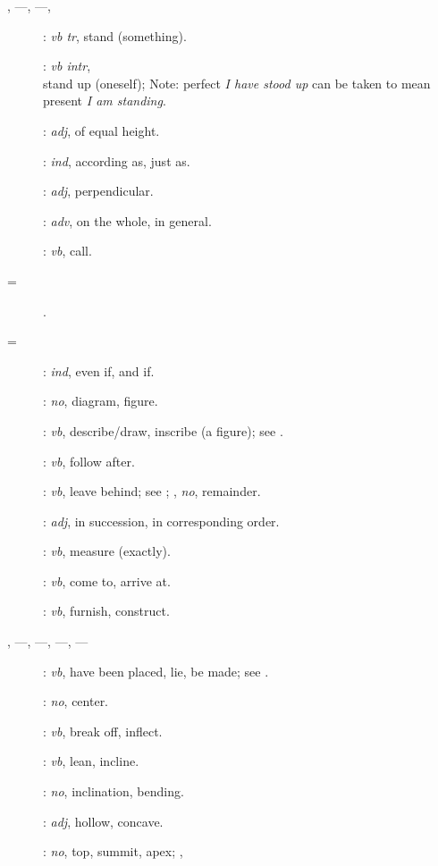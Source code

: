 {\begin{description}
\item[, ---, ---, ]: {\em vb tr}, 
stand (something).
\item[]: {\em vb intr}, \\
stand up (oneself); Note: perfect {\em I have stood up} can be taken to mean present {\em I am standing}.
\item[]: {\em adj}, of equal height.
\item[]: {\em ind}, according as, just as.
\item[]: {\em adj}, perpendicular.
\item[]: {\em adv}, on the whole, in general.
\item[]: {\em vb}, call.
\item[ = ].
\item[ = ]: {\em ind}, even if, and if.
\item[]: {\em no}, diagram, figure.
\item[]: {\em vb}, describe/draw, inscribe (a figure); see .
\item[]: {\em vb}, follow after.
\item[] : {\em vb}, leave behind; see ; , {\em no},
remainder. 
\item[]: {\em adj}, in succession, in corresponding order.
\item[]: {\em vb}, measure (exactly).
\item[]: {\em vb}, come to, arrive at.
\item[]: {\em vb}, furnish, construct.
\item[, ---, ---, ---, ---]: {\em vb}, have been placed,
lie, be made; see .
\item[]: {\em no}, center.
\item[]: {\em vb}, break off, inflect.
\item[]: {\em vb}, lean, incline.
\item[]: {\em no}, inclination, bending.
\item[]: {\em adj}, hollow, concave.
\item[]: {\em no}, top, summit, apex; ,

\end{description}}
